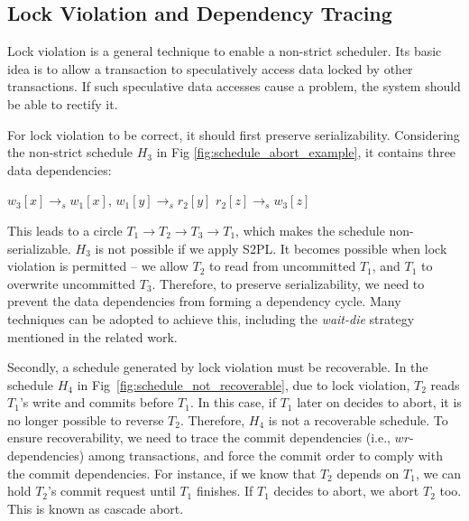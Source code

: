 \documentclass[conference]{IEEEtran}
\begin{document}

\subsection{Lock Violation and Dependency Tracing}

Lock violation is a general technique to enable a non-strict scheduler.
Its basic idea is to allow a transaction to speculatively access data locked by other transactions.
If such speculative data accesses cause a problem, the system should be able to rectify it.

For lock violation to be correct, it should first preserve serializability.
Considering the non-strict schedule ${H_3}$ in Fig \ref{fig:schedule_abort_example},
it contains three data dependencies:

\begin{center}
${w_3[x] \rightarrow _s w_1[x]}$,
${w_1[y] \rightarrow _s r_2[y]}$
${r_2[z] \rightarrow _s w_3[z]}$
\end{center}

This leads to a circle ${T_1 \rightarrow T_2 \rightarrow T_3 \rightarrow T_1}$, which makes the schedule non-serializable.
${H_3}$ is not possible if we apply S2PL. It becomes possible when lock violation is permitted -- we allow
${T_2}$ to read from uncommitted ${T_1}$, and ${T_1}$ to overwrite uncommitted ${T_3}$.
Therefore, to preserve serializability, we need to prevent the data dependencies from forming a dependency cycle.
Many techniques can be adopted to achieve this, including the \emph{wait-die} strategy mentioned in the related work.

Secondly, a schedule generated by lock violation must be recoverable.
In the schedule ${H_4}$ in Fig~\ref{fig:schedule_not_recoverable}, due to lock violation,
${T_2}$ reads  ${T_1}$'s write and commits before ${T_1}$.
In this case, if ${T_1}$ later on decides to abort, it is no longer possible to reverse ${T_2}$.
Therefore, ${H_4}$ is not a recoverable schedule.
To ensure recoverability, we need to trace the commit dependencies (i.e., $wr$-dependencies) among transactions, and force the commit order to comply with the commit dependencies.
For instance, if we know that ${T_2}$ depends on ${T_1}$, we can hold ${T_2}$'s commit request until ${T_1}$ finishes.
If ${T_1}$ decides to abort, we abort ${T_2}$ too. This is known as cascade abort. 
\end{document}

